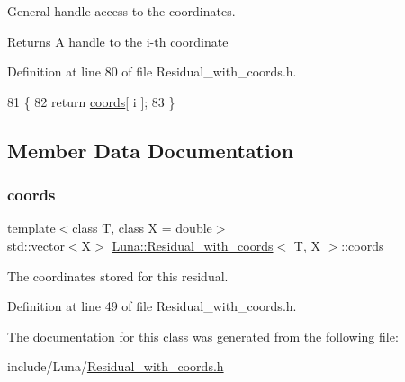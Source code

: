 General handle access to the coordinates. 

\begin{DoxyReturn}{Returns}
A handle to the i-\/th coordinate 
\end{DoxyReturn}


Definition at line 80 of file Residual\+\_\+with\+\_\+coords.\+h.


\begin{DoxyCode}
81   \{
82     \textcolor{keywordflow}{return} \hyperlink{classLuna_1_1Residual__with__coords_a3f69e7026c7f86e14bc94ededc86ee62}{coords}[ i ];
83   \}
\end{DoxyCode}


\subsection{Member Data Documentation}
\mbox{\label{classLuna_1_1Residual__with__coords_a3f69e7026c7f86e14bc94ededc86ee62}} 
\subsubsection{\texorpdfstring{coords}{coords}}
{\footnotesize\ttfamily template$<$class T, class X = double$>$ \\
std\+::vector$<$X$>$ \hyperlink{classLuna_1_1Residual__with__coords}{Luna\+::\+Residual\+\_\+with\+\_\+coords}$<$ T, X $>$\+::coords\hspace{0.3cm}{\ttfamily [protected]}}



The coordinates stored for this residual. 



Definition at line 49 of file Residual\+\_\+with\+\_\+coords.\+h.



The documentation for this class was generated from the following file\+:\begin{DoxyCompactItemize}
\item 
include/\+Luna/\hyperlink{Residual__with__coords_8h}{Residual\+\_\+with\+\_\+coords.\+h}\end{DoxyCompactItemize}
